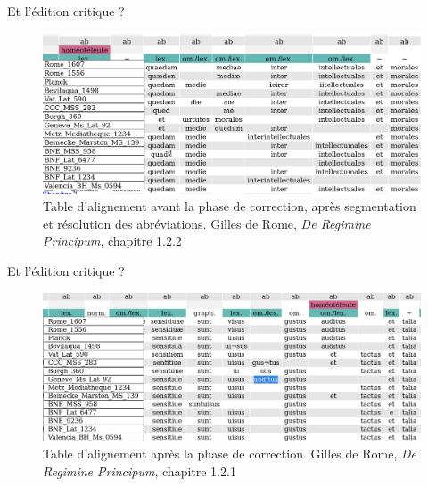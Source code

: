 \documentclass[11pt,aspectratio=169]{beamer}
\begin{document}
\begin{frame}{Et l'édition critique ?}
\begin{center}
\begin{figure}
\includegraphics[width=1\textwidth]{img/avant_correction.png}
\caption{Table d'alignement avant la phase de correction, après segmentation et résolution des abréviations. Gilles de Rome, \textit{De Regimine Principum}, chapitre 1.2.2}
\end{figure}
\end{center}
\end{frame}

\begin{frame}{Et l'édition critique ?}
\begin{center}
\begin{figure}
\includegraphics[width=1\textwidth]{img/apres_correction.png}
\caption{Table d'alignement après la phase de correction. Gilles de Rome, \textit{De Regimine Principum}, chapitre 1.2.1}
\end{figure}
\end{center}
\end{frame}
\end{document}
